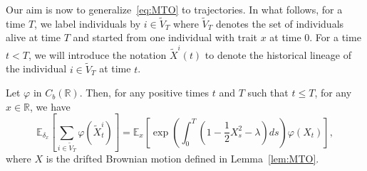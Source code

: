 \documentclass[AHL,Unicode,longabstracts,published]{cedram}
\newcommand*\R{\mathbb{R}}
\newcommand*\E{\mathbb{E}}
\begin{document}
Our aim is now to generalize~\eqref{eq:MTO} to trajectories. In what follows, for a time $T$, we label individuals by $i\in \widetilde{V}_T$ where $\widetilde{V}_{T}$ denotes the set of individuals alive at time $T$ and started from one individual with trait $x$ at time $0$. For a time $t<T$, we will introduce the notation $\widetilde{X}^i(t)$ to denote the historical lineage of the individual $i\in \widetilde{V}_{T}$ at time $t$.



\begin{lemm}\label{lem:MTO05}
Let $\varphi$ in $C_{b}(\R)$. Then, for any positive times $t$ and $T$ such that $t\leq T$, for any $x\in \R$, we have
\begin{equation}\label{eq:MTO05}
\E_{\delta_{x}}\left[\sum_{i \in \widetilde{V}_{T}} \varphi\left(\widetilde{X}^{i}_{t}\right) \right]=\E_{x}\left[\exp\left(\int_{0}^{T} \left(1-\frac{1}{2}X_{s}^{2}-\lambda \right)ds \right)\varphi\left(X_{t}\right) \right],
\end{equation}
where $X$ is the drifted Brownian motion defined in Lemma~\ref{lem:MTO}.
\end{lemm}
\end{document}
